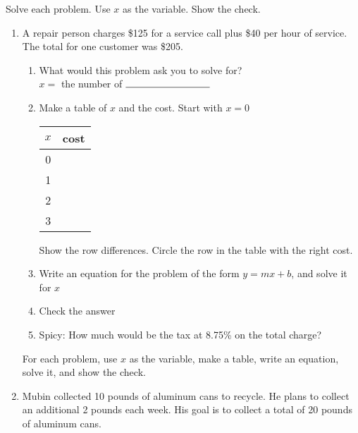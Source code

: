 \documentclass[12pt, oneside]{article}
\begin{document}
Solve each problem. Use $x$ as the variable. Show the check.
  \begin{enumerate}
\subsubsection*{Word Problem Wednesday}

  \item A repair person charges \$125 for a service call plus \$40 per hour of service. The total for one customer was \$205.
  \begin{enumerate}
    \item What would this problem ask you to solve for? \\[0.5cm]
    \hspace{1cm} $x=$ the number of $\rule{3cm}{0.15mm}$
    \item Make a table of $x$ and the cost. Start with $x=0$ \\[0.5cm]
    \begin{center}
      \begin{tabular}{|c|r|}
      \hline
      $x$ & cost\\
      \hline
      0 &  \\
      \hline
      1 &  \\
      \hline
      2 &  \\
      \hline
      3 &  \\
      \hline
      \end{tabular}
    \end{center}
    Show the row differences. Circle the row in the table with the right cost.
    \item Write an equation for the problem of the form $y=mx+b$, and solve it for $x$ \vspace{3.5cm}
    \item Check the answer \vspace{2.5cm}
    \item Spicy: How much would be the tax at 8.75\% on the total charge?
  \end{enumerate}

\newpage
For each problem, use $x$ as the variable, make a table, write an equation, solve it, and show the check. \\%

  \item Mubin collected 10 pounds of aluminum cans to recycle. He plans to collect an additional 2 pounds each week. His goal is to collect a total of 20 pounds of aluminum cans. \vspace{8cm}


\end{enumerate}
\end{document}
